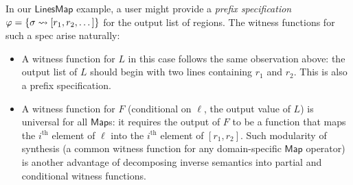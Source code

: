 In our $\mathsf{LinesMap}$ example, a user might provide a \emph{prefix specification} \mbox{$\varphi = \{ \sigma
\rightsquigarrow [r_1, r_2, \dots] \}$} for the output list of regions.
The witness functions for such a spec arise naturally:
\begin{itemize}
    \item A witness function for $L$ in this case follows the same observation above: the output list of $L$ should
        begin with two lines containing $r_1$ and $r_2$.
        This is also a prefix specification.
    \item A witness function for $F$ (conditional on $\ell$, the output value of $L$) is universal for all
        $\mathsf{Map}$s: it requires the output of $F$ to be a function that maps the $i^{\text{th}}$ element of $\ell$
        into the $i^{\text{th}}$ element of $[r_1, r_2]$.
        Such modularity of synthesis (a common witness function for any domain-specific $\mathsf{Map}$ operator) is
        another advantage of decomposing inverse semantics into partial and conditional witness functions.
\end{itemize}

